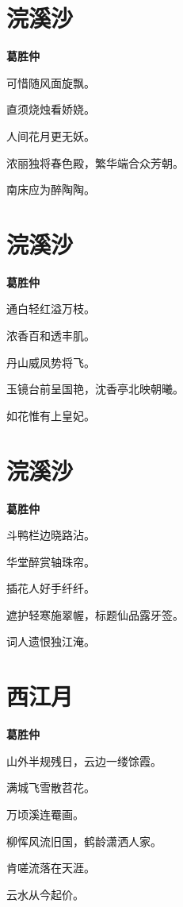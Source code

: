 \documentclass[12pt,a4paper]{ctexbook}
\begin{document}
\section{浣溪沙}
\textbf{葛胜仲}\par\vspace{0.5em}
可惜随风面旋飘。\par
直须烧烛看娇娆。\par
人间花月更无妖。\par
浓丽独将春色殿，繁华端合众芳朝。\par
南床应为醉陶陶。\par

\section{浣溪沙}
\textbf{葛胜仲}\par\vspace{0.5em}
通白轻红溢万枝。\par
浓香百和透丰肌。\par
丹山威凤势将飞。\par
玉镜台前呈国艳，沈香亭北映朝曦。\par
如花惟有上皇妃。\par

\section{浣溪沙}
\textbf{葛胜仲}\par\vspace{0.5em}
斗鸭栏边晓路沾。\par
华堂醉赏轴珠帘。\par
插花人好手纤纤。\par
遮护轻寒施翠幄，标题仙品露牙签。\par
词人遗恨独江淹。\par

\section{西江月}
\textbf{葛胜仲}\par\vspace{0.5em}
山外半规残日，云边一缕馀霞。\par
满城飞雪散苕花。\par
万顷溪连罨画。\par
柳恽风流旧国，鹤龄潇洒人家。\par
肯嗟流落在天涯。\par
云水从今起价。\par
\end{document}
